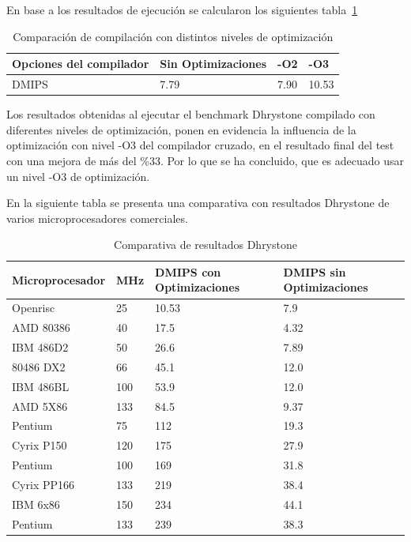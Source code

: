 En base a los resultados de ejecución se calcularon los siguientes 
tabla~\ref{tab:optimiza} 
\begin{table}[h!]
\begin{center}
\begin{tabular}{ |l |l |l |l |}
\hline
\rowcolor[gray]{0.8} Opciones del compilador & Sin Optimizaciones & -O2 &-O3 \\
\hline
DMIPS 					& 7.79 			&   7.90  &  10.53  \\
\hline
\end{tabular}
\end{center}
\label{tab:optimiza}
\caption{Comparación de compilación con distintos niveles de optimización}
\end{table}

Los resultados obtenidas al ejecutar el benchmark Dhrystone compilado con diferentes niveles de optimización, ponen en evidencia la influencia de la optimización con nivel -O3 del compilador cruzado, en el resultado final del test con una mejora de más del \%33. Por lo que se ha concluido, que es adecuado usar un nivel -O3 de optimización.


En la siguiente tabla se presenta una comparativa con resultados Dhrystone de varios microprocesadores comerciales.

\begin{table}[h!]
\begin{center}
\begin{tabular}{ |l |l |l |l |}
\hline
\rowcolor[gray]{0.8} Microprocesador& MHz & DMIPS con Optimizaciones & DMIPS sin Optimizaciones \\
\hline
Openrisc		  &25	&10.53	&7.9\\
\hline
AMD 80386         &40   &17.5   &4.32\\
\hline
IBM 486D2         &50   &26.6   &7.89\\
\hline
80486 DX2         &66   &45.1   &12.0\\
\hline
IBM 486BL        &100   &53.9   &12.0\\
\hline
AMD 5X86         &133   &84.5   &9.37\\
\hline
Pentium           &75    &112   &19.3\\
\hline
Cyrix P150       &120    &175   &27.9\\
\hline
Pentium          &100    &169   &31.8\\
\hline
Cyrix PP166      &133    &219   &38.4\\
\hline
IBM 6x86         &150    &234   &44.1\\
\hline
Pentium          &133    &239   &38.3\\
\hline
\end{tabular}
\end{center}
\label{tab:conbench}
\caption{Comparativa de resultados Dhrystone}
\end{table}

